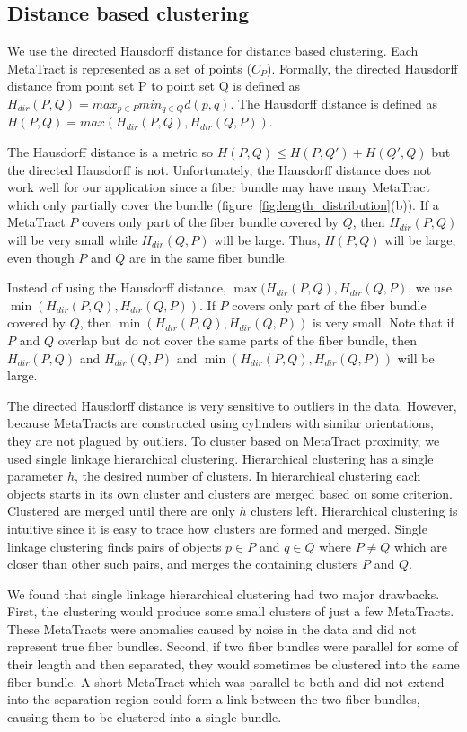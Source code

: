   
\subsection{Distance based clustering}
 \label{subsec:dist_clustering}
 We use the directed Hausdorff distance for distance based clustering.
 Each MetaTract is represented as a set of points ($C_P$). 
 Formally, the directed Hausdorff distance from point set P to point set Q is defined as 
 $H_{dir}(P,Q) = max_{p \in P} min_{q \in Q} d(p,q).$ The Hausdorff distance is defined as $H(P,Q) = max(H_{dir}(P,Q),H_{dir}(Q,P))$.
 
 The Hausdorff distance is a metric so $H(P,Q) \le H(P,Q') + H(Q',Q)$
 but the directed Hausdorff is not.
 Unfortunately, the Hausdorff distance does not work well for our application since a fiber bundle may have many MetaTract which only partially cover the bundle (figure~\ref{fig:length_distribution}(b)).
 If a MetaTract $P$ covers only part of the fiber bundle covered by $Q$,
 then $H_{dir}(P,Q)$ will be very small while $H_{dir}(Q,P)$ will be large.
 Thus, $H(P,Q)$ will be large, even though $P$ and $Q$ are in the same
 fiber bundle.
 
 Instead of using the Hausdorff distance, $\max(H_{dir}(P,Q),H_{dir}(Q,P)$, we use $\min(H_{dir}(P,Q),H_{dir}(Q,P))$. If $P$ covers only part of the fiber bundle covered by $Q$, then $\min(H_{dir}(P,Q),H_{dir}(Q,P))$ is very small.
 Note that if $P$ and $Q$ overlap but do not cover the same parts of the fiber bundle, then $H_{dir}(P,Q)$ and $H_{dir}(Q,P)$ and $\min(H_{dir}(P,Q),H_{dir}(Q,P))$ will be large.
 
 The directed Hausdorff distance is very sensitive to outliers in the data.
 However, because MetaTracts are constructed using cylinders with similar orientations, they are not plagued by outliers.
 To cluster based on MetaTract proximity, we used single linkage hierarchical clustering.
 Hierarchical clustering has a single parameter $h$, the desired number of clusters.
 In hierarchical clustering each objects starts in its own cluster and clusters are merged based on some criterion.
 Clustered are merged until there are only $h$ clusters left.
 Hierarchical clustering is intuitive since it is easy to trace how clusters are formed and merged.
 Single linkage clustering finds pairs of objects $p \in P$ and $q \in Q$ where $P \neq Q$ which are closer than other such pairs, and merges the containing clusters $P$ and $Q$.
 
 We found that single linkage hierarchical clustering had two major drawbacks.
 First, the clustering would produce some small clusters of just a few MetaTracts.
 These MetaTracts were anomalies caused by noise in the data and did not represent true fiber bundles.
 Second, if two fiber bundles were parallel for some of their length and then separated, they would sometimes be clustered into the same
 fiber bundle.
 A short MetaTract which was parallel to both and did not extend into the separation region could form a link between the two fiber bundles,
 causing them to be clustered into a single bundle.
 
